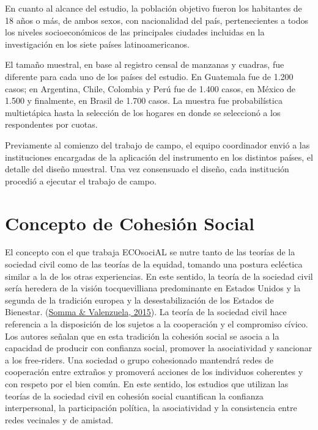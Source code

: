\documentclass[
  12pt,
]{book}
\begin{document}
En cuanto al alcance del estudio, la población objetivo fueron los habitantes de 18 años o más, de ambos sexos, con nacionalidad del país, pertenecientes a todos los niveles socioeconómicos de las principales ciudades incluidas en la investigación en los siete países latinoamericanos.

El tamaño muestral, en base al registro censal de manzanas y cuadras, fue diferente para cada uno de los países del estudio. En Guatemala fue de 1.200 casos; en Argentina, Chile, Colombia y Perú fue de 1.400 casos, en México de 1.500 y finalmente, en Brasil de 1.700 casos. La muestra fue probabilística multietápica hasta la selección de los hogares en donde se seleccionó a los respondentes por cuotas.

Previamente al comienzo del trabajo de campo, el equipo coordinador envió a las instituciones encargadas de la aplicación del instrumento en los distintos países, el detalle del diseño muestral. Una vez consensuado el diseño, cada institución procedió a ejecutar el trabajo de campo.

\hypertarget{concepto-de-cohesiuxf3n-social-4}{%
\section{Concepto de Cohesión Social}\label{concepto-de-cohesiuxf3n-social-4}}

El concepto con el que trabaja ECOsociAL se nutre tanto de las teorías de la sociedad civil como de las teorías de la equidad, tomando una postura ecléctica similar a la de los otras experiencias. En este sentido, la teoría de la sociedad civil sería heredera de la visión tocquevilliana predominante en Estados Unidos y la segunda de la tradición europea y la desestabilización de los Estados de Bienestar. (\protect\hyperlink{ref-somma2015paradojas}{Somma \& Valenzuela, 2015}). La teoría de la sociedad civil hace referencia a la disposición de los sujetos a la cooperación y el compromiso cívico. Los autores señalan que en esta tradición la cohesión social se asocia a la capacidad de producir con confianza social, promover la asociatividad y sancionar a los free-riders. Una sociedad o grupo cohesionado mantendrá redes de cooperación entre extraños y promoverá acciones de los individuos coherentes y con respeto por el bien común. En este sentido, los estudios que utilizan las teorías de la sociedad civil en cohesión social cuantifican la confianza interpersonal, la participación política, la asociatividad y la consistencia entre redes vecinales y de amistad.
\end{document}
